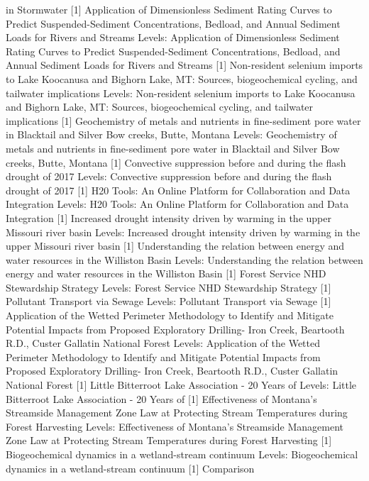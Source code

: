 \documentclass[]{article}
\begin{document}
in Stormwater {[}1{]} Application of Dimensionless Sediment Rating
Curves to Predict Suspended-Sediment Concentrations, Bedload, and Annual
Sediment Loads for Rivers and Streams Levels: Application of
Dimensionless Sediment Rating Curves to Predict Suspended-Sediment
Concentrations, Bedload, and Annual Sediment Loads for Rivers and
Streams {[}1{]} Non-resident selenium imports to Lake Koocanusa and
Bighorn Lake, MT: Sources, biogeochemical cycling, and tailwater
implications Levels: Non-resident selenium imports to Lake Koocanusa and
Bighorn Lake, MT: Sources, biogeochemical cycling, and tailwater
implications {[}1{]} Geochemistry of metals and nutrients in
fine-sediment pore water in Blacktail and Silver Bow creeks, Butte,
Montana Levels: Geochemistry of metals and nutrients in fine-sediment
pore water in Blacktail and Silver Bow creeks, Butte, Montana {[}1{]}
Convective suppression before and during the flash drought of 2017
Levels: Convective suppression before and during the flash drought of
2017 {[}1{]} H20 Tools: An Online Platform for Collaboration and Data
Integration Levels: H20 Tools: An Online Platform for Collaboration and
Data Integration {[}1{]} Increased drought intensity driven by warming
in the upper Missouri river basin Levels: Increased drought intensity
driven by warming in the upper Missouri river basin {[}1{]}
Understanding the relation between energy and water resources in the
Williston Basin Levels: Understanding the relation between energy and
water resources in the Williston Basin {[}1{]} Forest Service NHD
Stewardship Strategy Levels: Forest Service NHD Stewardship Strategy
{[}1{]} Pollutant Transport via Sewage Levels: Pollutant Transport via
Sewage {[}1{]} Application of the Wetted Perimeter Methodology to
Identify and Mitigate Potential Impacts from Proposed Exploratory
Drilling- Iron Creek, Beartooth R.D., Custer Gallatin National Forest
Levels: Application of the Wetted Perimeter Methodology to Identify and
Mitigate Potential Impacts from Proposed Exploratory Drilling- Iron
Creek, Beartooth R.D., Custer Gallatin National Forest {[}1{]} Little
Bitterroot Lake Association - 20 Years of Levels: Little Bitterroot Lake
Association - 20 Years of {[}1{]} Effectiveness of Montana's Streamside
Management Zone Law at Protecting Stream Temperatures during Forest
Harvesting Levels: Effectiveness of Montana's Streamside Management Zone
Law at Protecting Stream Temperatures during Forest Harvesting {[}1{]}
Biogeochemical dynamics in a wetland-stream continuum Levels:
Biogeochemical dynamics in a wetland-stream continuum {[}1{]} Comparison
\end{document}
